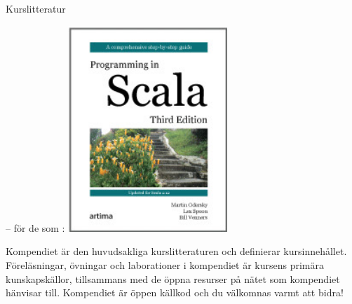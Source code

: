 \begin{SlideExtra}{Kurslitteratur}
\begin{minipage}{0.35\textwidth}
\noindent -- för de som :
\vskip0.7mm
\includegraphics[width=0.45\textwidth]{../img/pinsbook.jpg}\hskip4mm
\end{minipage}
\end{SlideExtra}
\fi

\ifkompendium
\noindent Kompendiet är den huvudsakliga kurslitteraturen och definierar kursinnehållet. Föreläsningar, övningar och laborationer i kompendiet är kursens primära kunskapskällor, tillsammans med de öppna resurser på nätet som kompendiet hänvisar till. Kompendiet är öppen källkod och du välkomnas varmt att bidra!

